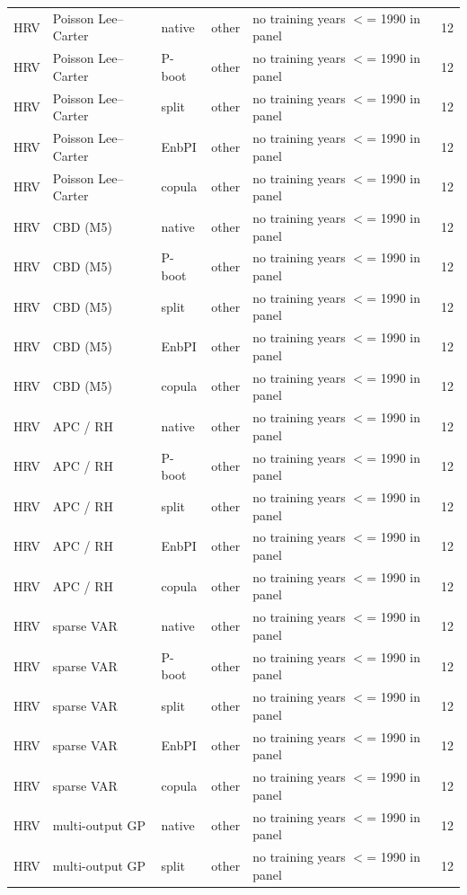 {\begin{longtable}{@{}lllp{1.6cm}p{6.2cm}r@{}}
HRV & Poisson Lee--Carter & native & other & no training years $<$= 1990 in panel & 12 \\
HRV & Poisson Lee--Carter & P-boot & other & no training years $<$= 1990 in panel & 12 \\
HRV & Poisson Lee--Carter & split & other & no training years $<$= 1990 in panel & 12 \\
HRV & Poisson Lee--Carter & EnbPI & other & no training years $<$= 1990 in panel & 12 \\
HRV & Poisson Lee--Carter & copula & other & no training years $<$= 1990 in panel & 12 \\
HRV & CBD (M5) & native & other & no training years $<$= 1990 in panel & 12 \\
HRV & CBD (M5) & P-boot & other & no training years $<$= 1990 in panel & 12 \\
HRV & CBD (M5) & split & other & no training years $<$= 1990 in panel & 12 \\
HRV & CBD (M5) & EnbPI & other & no training years $<$= 1990 in panel & 12 \\
HRV & CBD (M5) & copula & other & no training years $<$= 1990 in panel & 12 \\
HRV & APC / RH & native & other & no training years $<$= 1990 in panel & 12 \\
HRV & APC / RH & P-boot & other & no training years $<$= 1990 in panel & 12 \\
HRV & APC / RH & split & other & no training years $<$= 1990 in panel & 12 \\
HRV & APC / RH & EnbPI & other & no training years $<$= 1990 in panel & 12 \\
HRV & APC / RH & copula & other & no training years $<$= 1990 in panel & 12 \\
HRV & sparse VAR & native & other & no training years $<$= 1990 in panel & 12 \\
HRV & sparse VAR & P-boot & other & no training years $<$= 1990 in panel & 12 \\
HRV & sparse VAR & split & other & no training years $<$= 1990 in panel & 12 \\
HRV & sparse VAR & EnbPI & other & no training years $<$= 1990 in panel & 12 \\
HRV & sparse VAR & copula & other & no training years $<$= 1990 in panel & 12 \\
HRV & multi-output GP & native & other & no training years $<$= 1990 in panel & 12 \\
HRV & multi-output GP & split & other & no training years $<$= 1990 in panel & 12 \\

\end{longtable}}

